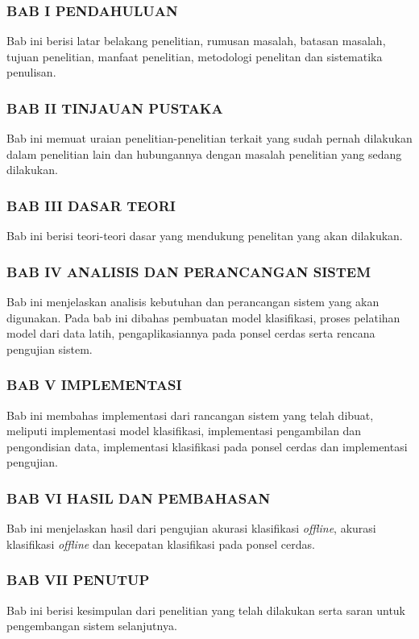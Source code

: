 \subsubsection{BAB I PENDAHULUAN}
Bab ini berisi latar belakang penelitian, rumusan masalah, batasan masalah, tujuan penelitian, manfaat penelitian, metodologi penelitan dan sistematika penulisan.

\subsubsection{BAB II TINJAUAN PUSTAKA}
Bab ini memuat uraian penelitian-penelitian terkait yang sudah pernah dilakukan dalam penelitian lain dan hubungannya dengan masalah penelitian yang sedang dilakukan.

\subsubsection{BAB III DASAR TEORI}
Bab ini berisi teori-teori dasar yang mendukung penelitan yang akan dilakukan.

\subsubsection{BAB IV ANALISIS DAN PERANCANGAN SISTEM}
Bab ini menjelaskan analisis kebutuhan dan perancangan sistem yang akan digunakan. Pada bab ini dibahas pembuatan model klasifikasi, proses pelatihan model dari data latih, pengaplikasiannya pada ponsel cerdas serta rencana pengujian sistem.

\subsubsection{BAB V IMPLEMENTASI}
Bab ini membahas implementasi dari rancangan sistem yang telah dibuat, meliputi implementasi model klasifikasi, implementasi pengambilan dan pengondisian data, implementasi klasifikasi pada ponsel cerdas dan implementasi pengujian.

\subsubsection{BAB VI HASIL DAN PEMBAHASAN}
Bab ini menjelaskan hasil dari pengujian akurasi klasifikasi \textit{offline}, akurasi klasifikasi \textit{offline} dan kecepatan klasifikasi pada ponsel cerdas.

\subsubsection{BAB VII PENUTUP}
Bab ini berisi kesimpulan dari penelitian yang telah dilakukan serta saran untuk pengembangan sistem selanjutnya.
